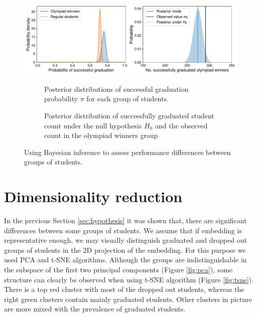 \documentclass{article}
\begin{document}
\begin{figure}[t!]
  \centering
  \includegraphics[width=1\linewidth,trim={0.5cm 0 0 0}]{../gfx/testing_fig.pdf}
  \hfill
  \begin{subfigure}{0.48\textwidth}
    \centering
    \caption{Posterior distributions of successful graduation probability $\pi$ for each group of students.}
    \label{fig:test_1}
  \end{subfigure}
  \hfill
  \begin{subfigure}{0.49\textwidth}
    \centering
    \caption{Posterior distribution of successfully graduated student count under the null hypothesis $H_0$ and the observed count in the olympiad winners group}
    \label{fig:test_2}
  \end{subfigure}
  \hfill
  \captionsetup{belowskip=-15pt}
  \caption{Using Bayesian inference to assess performance differences between groups of students.}
  \label{fig:testing}

\end{figure}



\section{Dimensionality reduction}
\label{sec:reduction}
In the previous Section \ref{sec:hypothesis} it was shown that, there are significant differences between some groups of students. We assume that if embedding is representative enough, we may visually distinguish graduated and dropped out groups of students in the 2D projection of the embedding. For this purpose we used PCA and t-SNE \cite{van2008visualizing} algorithms. Although the groups are indistinguishable in the subspace of the first two principal components (Figure \ref{fig:pca}), some structure can clearly be observed when using t-SNE algorithm (Figure \ref{fig:tsne}). There is a top red cluster with most of the dropped out students, whereas the right green clusters contain mainly graduated students. Other clusters in picture are more mixed with the prevalence of graduated students.
\end{document}

